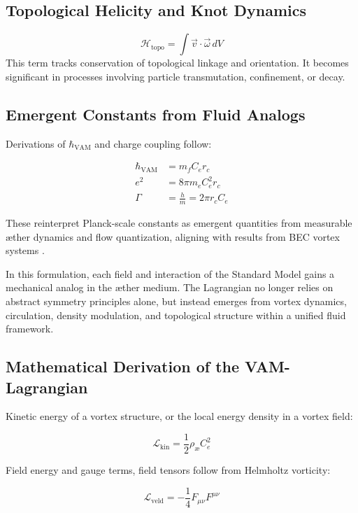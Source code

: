 \subsection{Topological Helicity and Knot Dynamics}
\begin{equation}
    \mathcal{H}_\text{topo} = \int \vec{v} \cdot \vec{\omega} \, dV
\end{equation}
This term tracks conservation of topological linkage and orientation. It becomes significant in processes involving particle transmutation, confinement, or decay.

\subsection{Emergent Constants from Fluid Analogs}
Derivations of $\hbar_{\text{VAM}}$ and charge coupling follow:

\begin{align}
    \hbar_{\text{VAM}} &= m_f C_e r_c \\
    e^2 &= 8\pi m_e C_e^2 r_c \\
    \Gamma &= \frac{h}{m} = 2\pi r_c C_e
\end{align}

These reinterpret Planck-scale constants as emergent quantities from measurable æther dynamics and flow quantization, aligning with results from BEC vortex systems \cite{Pethick2008BEC, Donnelly1991QuantizedVortices}.

In this formulation, each field and interaction of the Standard Model gains a mechanical analog in the æther medium. The Lagrangian no longer relies on abstract symmetry principles alone, but instead emerges from vortex dynamics, circulation, density modulation, and topological structure within a unified fluid framework.


\subsection*{Mathematical Derivation of the VAM-Lagrangian}

Kinetic energy of a vortex structure, or the local energy density in a vortex field:

\[
    \mathcal{L}_\text{kin} = \frac{1}{2}\rho_\text{\ae} C_e^2
\]

Field energy and gauge terms, field tensors follow from Helmholtz vorticity:

\[
    \mathcal{L}_\text{veld} = -\frac{1}{4}F_{\mu\nu}F^{\mu\nu}
\]

